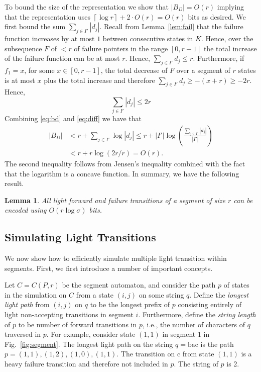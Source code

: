 \documentclass{article}
\newcommand{\ceil}[1]{\left\lceil{#1}\right\rceil}
\newtheorem{lemma}{Lemma}
\begin{document}
To bound the size of the representation we show that $|B_D| = O(r)$
implying that the representation uses $\ceil{\log r} + 2\cdot O(r) =
O(r)$ bits as desired. We first bound the sum $\sum_{j \in I'}
|d_j|$. Recall from Lemma~\ref{lem:fail} that the failure function
increases by at most $1$ between consecutive states in $K$. Hence,
over the subsequence $F$ of $<r$ of failure pointers in the range
$[0,r-1]$ the total increase of the failure function can be at most
$r$. Hence, $\sum_{j \in I'} d_j \leq r$. Furthermore, if $f_1 = x$,
for some $x \in [0, r-1]$, the total decrease of $F$ over a segment of
$r$ states is at most $x$ plus the total increase and therefore
$\sum_{j \in I'} d_j \geq -(x+r) \geq -2r$. Hence,
\begin{equation}\label{eq:diff}
\sum_{j \in I'} |d_j| \leq 2r
\end{equation}
Combining \eqref{eq:bd} and \eqref{eq:diff} we have that 
\begin{equation*}
\begin{split}
|B_D| &< r + \sum_{j \in I'} \log |d_j| \leq r +
|I'|\log\left(\frac{\sum_{j \in I'} |d_j|}{|I'|}\right) \\
& < r + r\log(2r/r) = O(r).
\end{split}
\end{equation*}
The second inequality follows from Jensen's inequality combined with
the fact that the logarithm is a concave function. In summary, we have
the following result.
\begin{lemma}\label{lem:encoding}
  All light forward and failure transitions of a segment of size $r$
  can be encoded using $O(r \log \sigma)$ bits.
\end{lemma}



\subsection{Simulating Light Transitions}
We now show how to efficiently simulate multiple light transition within
segments. First, we first introduce a number of important concepts. 


Let $C = C(P,r)$ be the segment automaton, and consider the path $p$
of states in the simulation on $C$ from a state $(i,j)$ on some string
$q$. Define the \emph{longest light path} from $(i,j)$ on $q$ to be
the longest prefix of $p$ consisting entirely of light non-accepting
transitions in segment $i$. Furthermore, define the \emph{string
  length} of $p$ to be number of forward transitions in $p$, i.e., the
number of characters of $q$ traversed in $p$. For example, consider
state $(1,1)$ in segment $1$ in Fig.~\ref{fig:segment}. The longest
light path on the string $q = \text{bac}$ is the path $p = (1,1),
(1,2), (1,0), (1,1)$. The transition on c from state $(1,1)$ is a
heavy failure transition and therefore not included in $p$. The string
of $p$ is 2.
\end{document}
